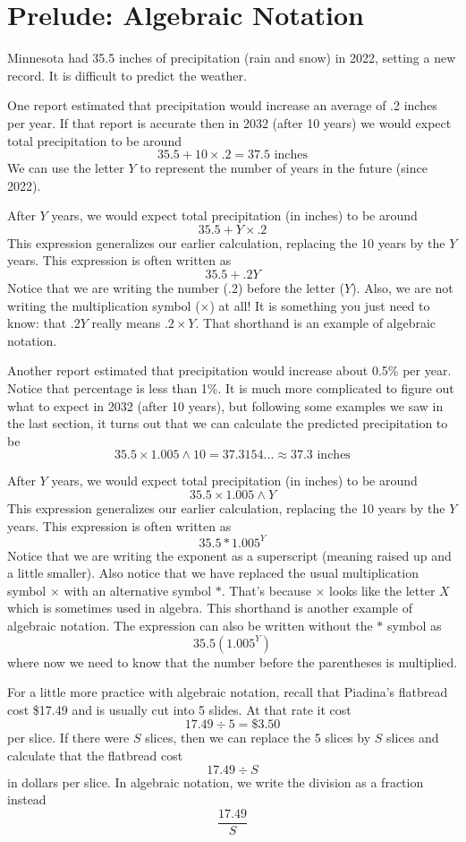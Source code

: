 \section{Prelude: Algebraic Notation}

Minnesota had 35.5 inches of precipitation (rain and snow) in 2022, setting a new record.  It is difficult to predict the weather.  

One report estimated that precipitation would increase an average of .2 inches per year.  If that report is accurate then in 2032 (after 10 years) we would expect total precipitation to be around $$35.5 + 10 \times .2 = 37.5 \text{ inches}$$
We can use the letter $Y$ to represent the number of years in the future (since 2022).  

After $Y$ years, we would expect total precipitation (in inches) to be around $$35.5 + Y \times .2$$
This expression generalizes our earlier calculation, replacing the 10 years by the $Y$ years. This expression is often written as $$35.5 + .2Y$$
Notice that we are writing the number (.2) before the letter ($Y$).  Also, we are not writing the multiplication symbol ($\times$) at all!  It is something you just need to know:  that $.2Y$ really means $.2 \times Y$.  That shorthand is an example of algebraic notation.

Another report estimated that precipitation would increase about 0.5\% per year.  Notice that percentage is less than 1\%.  It is much more complicated to figure out what to expect in 2032 (after 10 years), but following some examples we saw in the last section, it turns out that we can calculate the predicted precipitation to be $$35.5 \times 1.005 \land 10 = 37.3154... \approx 37.3 \text{ inches}$$

After $Y$ years, we would expect total precipitation (in inches) to be around $$35.5 \times 1.005 \land Y$$
This expression generalizes our earlier calculation, replacing the 10 years by the $Y$ years.  This expression is often written as $$35.5*1.005^Y$$
Notice that we are writing the exponent as a superscript (meaning raised up and a little smaller).  Also notice that we have replaced the usual multiplication symbol $\times$ with an alternative symbol $*$.  That's because $\times$ looks like the letter $X$ which is sometimes used in algebra.  This shorthand is another example of algebraic notation.  The expression can also be written without the $*$ symbol as  $$35.5(1.005^Y)$$
where now we need to know that the number before the parentheses is multiplied.

For a little more practice with algebraic notation, recall that Piadina's flatbread cost \$17.49 and is usually cut into 5 slides.  At that rate it cost $$17.49 \div 5 = \$3.50$$ per slice.  If there were $S$ slices, then we can replace the 5 slices by $S$ slices and calculate that the flatbread cost $$17.49 \div S$$ in dollars per slice.  In algebraic notation, we write the division as a fraction instead 
$$ \frac{17.49}{S}$$

